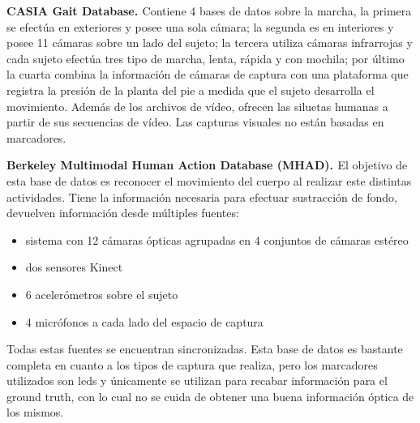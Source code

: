 \textbf{CASIA Gait Database. \cite{CASIA}}
Contiene 4 bases de datos sobre la marcha, la primera se efectúa en exteriores y posee una sola cámara; la segunda es en interiores  y posee 11 cámaras sobre un lado del sujeto; la tercera utiliza cámaras infrarrojas y cada sujeto efectúa tres tipo de marcha, lenta, rápida y con mochila; por último la cuarta combina la información de cámaras de captura con una plataforma que registra la presión de la planta del pie a medida que el sujeto desarrolla el movimiento. Además de los archivos de vídeo, ofrecen las siluetas humanas a partir de sus secuencias de vídeo. Las capturas visuales no están basadas en marcadores.

\textbf{Berkeley Multimodal Human Action Database (MHAD). \cite{MHAD}}
El objetivo de esta base de datos es reconocer el movimiento del cuerpo al realizar este distintas actividades. Tiene la información necesaria para efectuar sustracción de fondo, devuelven información desde múltiples fuentes:
\begin{itemize}
\item sistema con 12 cámaras ópticas agrupadas en 4 conjuntos de cámaras estéreo
\item dos sensores Kinect
\item 6 acelerómetros sobre el sujeto
\item 4 micrófonos a cada lado del espacio de captura
\end{itemize} Todas estas fuentes se encuentran sincronizadas. Esta base de datos es bastante completa en cuanto a los tipos de captura que realiza, pero los marcadores utilizados son leds y únicamente se utilizan para recabar información para el ground truth, con lo cual no se cuida de obtener una buena información óptica de los mismos. 



